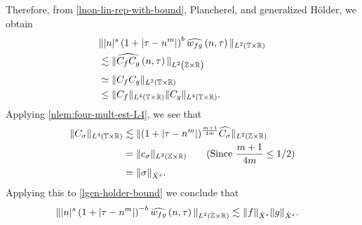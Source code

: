 %
%
Therefore, from \eqref{lnon-lin-rep-with-bound}, Plancherel, and generalized 
H\"{o}lder, we obtain
%
%
\begin{equation}
	\label{lgen-holder-bound}
	\begin{split}
		& \| |n|^s \left( 1 + | \tau - n^{m } | \right ) ^{b} \widehat{w_{fg}}\left( 
		n, \tau \right) \|_{L^2(\mathbb{T} \times \mathbb{R})}
		\\
		& \lesssim \|\widehat{C_f C_g }\left( n, \tau \right) 
		\|_{L^2\left( \dot{\mathbb{Z}} \times \mathbb{R} \right)}
		\\
		& \simeq \|C_f C_g \|_{L^2\left( \mathbb{T} \times \mathbb{R} \right)}
		\\
		& \le \|C_f \|_{L^4(\mathbb{T} \times \mathbb{R})} \|C_g \|_{L^4(\mathbb{T} \times \mathbb{R})}.
	\end{split}
\end{equation}
%
Applying \cref{nlem:four-mult-est-L4}, we see that
%
%
\begin{equation}
	\label{lfour-mult-conseq}
	\begin{split}
		\|C_\sigma\|_{L^4(\mathbb{T} \times \mathbb{R})} 
		& \lesssim \|(1 + | \tau - n^m |)^{\frac{m+1}{4m}} \widehat{C_\sigma}
		\|_{L^2(\mathbb{Z} \times \mathbb{R})}
		\\
		& = \|c_{\sigma} \|_{L^2(\mathbb{Z} \times \mathbb{R})} \qquad (\text{Since} \ \frac{m+1}{4m} \le 1/2 )
		\\
		& = \|\sigma \|_{\dot{X}^s}. 
	\end{split}
\end{equation}
%
%
Applying this to \eqref{lgen-holder-bound} we
conclude that
\begin{equation*}
	\begin{split}
		\| |n|^s \left( 1 + | \tau - n^{m } | \right ) ^{-b} \widehat{w_{fg}}\left( 
		n, \tau \right) \|_{L^2(\dot{\mathbb{Z}} \times \mathbb{R})}
		& \lesssim \|f\|_{\dot{X}^s} \|g\|_{\dot{X}^s}.
	\end{split}
\end{equation*}
%
%
%
